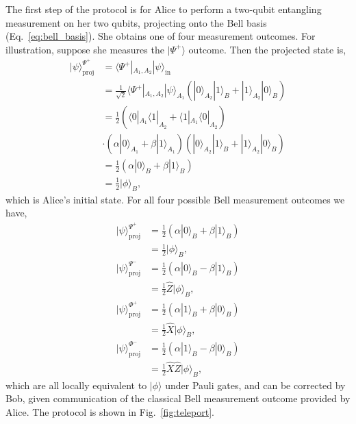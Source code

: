 \documentclass[aps,rmp,twocolumn,amsmath,amssymb,nofootinbib,superscriptaddress,longbibliography,floatfix]{revtex4-1}
\newcommand{\bra}[1]{\langle#1|}
\newcommand{\ket}[1]{|#1\rangle}
\begin{document}
The first step of the protocol is for Alice to perform a two-qubit entangling measurement on her two qubits, projecting onto the Bell basis (Eq.~\ref{eq:bell_basis}). She obtains one of four measurement outcomes. For illustration, suppose she measures the $\ket{\Psi^+}$ outcome. Then the projected state is,
\begin{align}
\ket\psi_\mathrm{proj}^{\Psi^+} &= \bra{\Psi^+}_{A_1,A_2} \ket\psi_\mathrm{in} \nonumber \\
&= \frac{1}{\sqrt{2}} \bra{\Psi^+}_{A_1,A_2}\ket\psi_{A_1}(\ket{0}_{A_2}\ket{1}_B + \ket{1}_{A_2}\ket{0}_B) \nonumber \\
&= \frac{1}{2} (\bra{0}_{A_1}\bra{1}_{A_2} + \bra{1}_{A_1}\bra{0}_{A_2}) \nonumber \\
&\cdot (\alpha\ket{0}_{A_1}+\beta\ket{1}_{A_1})(\ket{0}_{A_2}\ket{1}_B + \ket{1}_{A_2}\ket{0}_B) \nonumber \\
&= \frac{1}{2} (\alpha \ket{0}_B + \beta \ket{1}_B)\nonumber \\
&= \frac{1}{2} \ket\phi_B,
\end{align}
which is Alice's initial state. For all four possible Bell measurement outcomes we have,
\begin{align}
\ket\psi_\mathrm{proj}^{\Psi^+} &= \frac{1}{2} (\alpha \ket{0}_B + \beta \ket{1}_B) \nonumber \\
&= \frac{1}{2} \ket\phi_B, \nonumber \\
\ket\psi_\mathrm{proj}^{\Psi^-} &= \frac{1}{2} (\alpha \ket{0}_B - \beta \ket{1}_B) \nonumber \\
&= \frac{1}{2} \hat{Z}\ket\phi_B, \nonumber \\
\ket\psi_\mathrm{proj}^{\Phi^+} &= \frac{1}{2} (\alpha \ket{1}_B + \beta \ket{0}_B) \nonumber \\
&= \frac{1}{2} \hat{X} \ket\phi_B, \nonumber \\
\ket\psi_\mathrm{proj}^{\Phi^-} &= \frac{1}{2} (\alpha \ket{1}_B - \beta \ket{0}_B) \nonumber \\
&= \frac{1}{2} \hat{X}\hat{Z}\ket\phi_B,
\end{align}
which are all locally equivalent to $\ket\phi$ under Pauli gates, and can be corrected by Bob, given communication of the classical Bell measurement outcome provided by Alice. The protocol is shown in Fig.~\ref{fig:teleport}.
\end{document}
